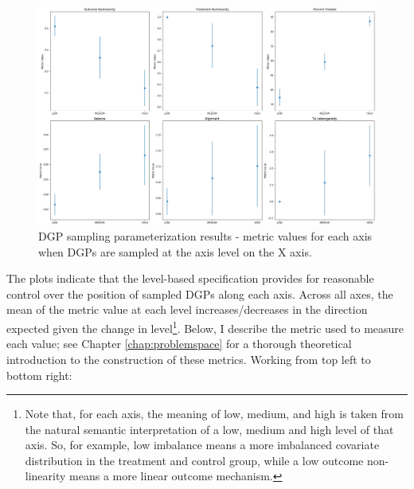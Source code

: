 \documentclass[../main.tex]{subfiles}
\begin{document}
\begin{figure}[ht!]
    \centering
    \includegraphics[width=1\linewidth]{figures/ch7-sampling-validation-1.png}
    \caption{DGP sampling parameterization results - metric values for each axis when DGPs are sampled at the axis level on the X axis.}
    \label{fig:sampling-validation-results-1}
\end{figure}

The plots indicate that the level-based specification provides for reasonable control over the position of sampled DGPs along each axis. Across all axes, the mean of the metric value at each level increases/decreases in the direction expected given the change in level\footnote{Note that, for each axis, the meaning of low, medium, and high is taken from the natural semantic interpretation of a low, medium and high level of that axis. So, for example, low imbalance means a more imbalanced covariate distribution in the treatment and control group, while a low outcome non-linearity means a more linear outcome mechanism.}. Below, I describe the metric used to measure each value; see Chapter \ref{chap:problemspace} for a thorough theoretical introduction to the construction of these metrics. Working from top left to bottom right:
\end{document}

